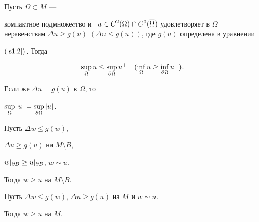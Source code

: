 




\vskip 2cm












\label{end}














\begin{props}


Пусть $\Omega\subset M$ ---


компактное подмножеcтво и \ $u\in C^2(\Omega)\cap C^0(\o


\Omega)$ удовлетворяет в $\Omega$ неравенствам $\Delta u\geq


g(u)$ $(\Delta u\leq g(u))$, где $g(u)$ определена в уравнении


$(\ref{s1.2})$. Тогда 


$$


\sup_{\Omega}u\leq\sup_{\d{\Omega}}u^+ \quad


(\inf_{\Omega}u\geq\inf_{\d{\Omega}}u^-).


$$


Если же $\Delta u=g(u)$ в $\Omega$, то 


$\sup\limits_{\Omega}|u|=\sup\limits_{\partial{\Omega}}|u|$.


\end{props} 








\begin{props}


Пусть $\Delta w\leq g(w)$,


$\Delta u\geq g(u)$ на $M\setminus B$, 


$w|_{\partial{B}}\geq u|_{\partial{B}}$, $w\sim u$. 


Тогда $w\geq u$ на $M\setminus B$. 





Пусть $\Delta w\leq g(w)$, $\Delta u\geq g(u)$ на $M$ и $w\sim u$. 


Тогда $w\geq u$ на $M$. 


\end{props}








